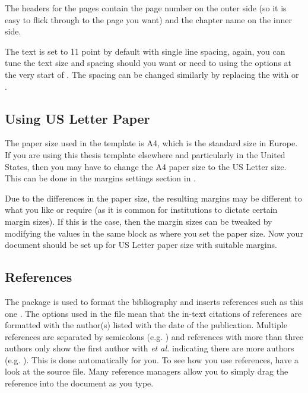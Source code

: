 The headers for the pages contain the page number on the outer side (so it is
easy to flick through to the page you want) and the chapter name on the inner
side.

The text is set to 11 point by default with single line spacing, again, you can
tune the text size and spacing should you want or need to using the options at
the very start of . The spacing can be changed similarly by
replacing the  with  or
.

\subsection{Using US Letter Paper}

The paper size used in the template is A4, which is the standard size in Europe.
If you are using this thesis template elsewhere and particularly in the United
States, then you may have to change the A4 paper size to the US Letter size.
This can be done in the margins settings section in .

Due to the differences in the paper size, the resulting margins may be different
to what you like or require (as it is common for institutions to dictate certain
margin sizes). If this is the case, then the margin sizes can be tweaked by
modifying the values in the same block as where you set the paper size. Now your
document should be set up for US Letter paper size with suitable margins.

\subsection{References}

The  package is used to format the bibliography and inserts references such as this one \parencite{Reference1}. The options used in the  file mean that the in-text citations of references are formatted with the author(s) listed with the date of the publication. Multiple references are separated by semicolons (e.g. \parencite{Reference2, Reference1}) and references with more than three authors only show the first author with \emph{et al.} indicating there are more authors (e.g. \parencite{Reference3}). This is done automatically for you. To see how you use references, have a look at the  source file. Many reference managers allow you to simply drag the reference into the document as you type.


